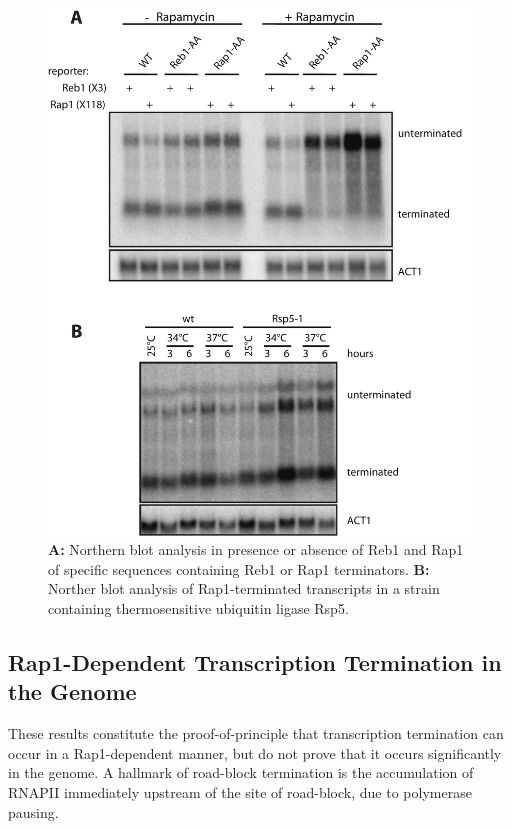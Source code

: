 \begin{figure}[hp!]

\centering
\includegraphics[width=\textwidth]{figures/results/rap/two.pdf}
\caption[Northen blot analysis of Rap1 and Reb1 terminated species]{\textbf{A: }Northern blot analysis in presence or absence of Reb1 and Rap1 of specific sequences containing Reb1 or Rap1 terminators. \textbf{B: }Norther blot analysis of Rap1-terminated transcripts in a strain containing thermosensitive ubiquitin ligase Rsp5. }
\label{fig:two}

\end{figure}

\singlespacing
\subsection*{Rap1-Dependent Transcription Termination in the \cer{} Genome}
\doublespacing

These results constitute the proof-of-principle that transcription termination can occur in a Rap1-dependent manner, but do not prove that it occurs significantly in the \cer{} genome. A hallmark of road-block termination is the accumulation of RNAPII immediately upstream of the site of road-block, due to polymerase pausing. 

